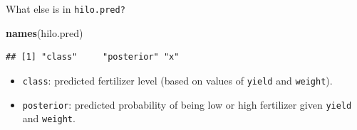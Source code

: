 \documentclass[ignorenonframetext,]{beamer}
\newenvironment{Shaded}{\begin{snugshade}}{\end{snugshade}}
\newcommand{\KeywordTok}[1]{\textcolor[rgb]{0.13,0.29,0.53}{\textbf{#1}}}
\newcommand{\NormalTok}[1]{#1}
\begin{document}
\begin{frame}[fragile]{What else is in \texttt{hilo.pred?}}
\protect\hypertarget{what-else-is-in-hilo.pred}{}

\small

\begin{Shaded}
\begin{Highlighting}[]
\KeywordTok{names}\NormalTok{(hilo.pred)}
\end{Highlighting}
\end{Shaded}

\begin{verbatim}
## [1] "class"     "posterior" "x"
\end{verbatim}

\normalsize

\begin{itemize}
\item
  \texttt{class}: predicted fertilizer level (based on values of
  \texttt{yield} and \texttt{weight}).
\item
  \texttt{posterior}: predicted probability of being low or high
  fertilizer given \texttt{yield} and \texttt{weight}.
\end{itemize}

\end{frame}
\end{document}
